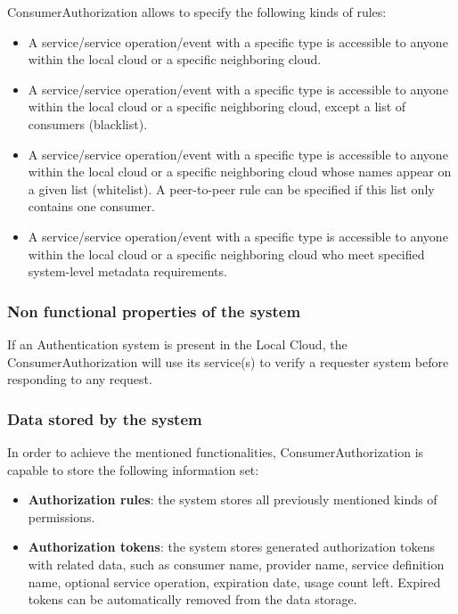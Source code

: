 \documentclass[a4paper]{arrowhead}
\begin{document}
ConsumerAuthorization allows to specify the following kinds of rules:

\begin{itemize}
    \item A service/service operation/event with a specific type  is accessible to anyone within the local cloud or a specific neighboring cloud.
    \item A service/service operation/event with a specific type is accessible to anyone within the local cloud or a specific neighboring cloud, except a list of consumers (blacklist).
    \item A service/service operation/event with a specific type is accessible to anyone within the local cloud or a specific neighboring cloud whose names appear on a given list (whitelist). A peer-to-peer rule can be specified if this list only contains one consumer.
    \item A service/service operation/event with a specific type is accessible to anyone within the local cloud or a specific neighboring cloud who meet specified system-level metadata requirements.
\end{itemize}

\subsubsection {Non functional properties of the system}
If an Authentication system is present in the Local Cloud, the ConsumerAuthorization will use its service(s) to verify a requester system before responding to any request. 

\subsubsection {Data stored by the system}
In order to achieve the mentioned functionalities, ConsumerAuthorization is capable to store the following information set:

\begin{itemize}
    \item \textbf{Authorization rules}: the system stores all previously mentioned kinds of permissions.
    \item \textbf{Authorization tokens}: the system stores generated authorization tokens with related data, such as consumer name, provider name, service definition name, optional service operation, expiration date, usage count left. Expired tokens can be automatically removed from the data storage.
\end{itemize}
\end{document}
